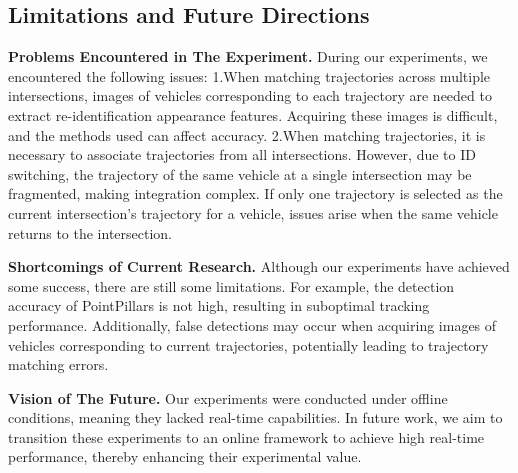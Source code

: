 \subsection{Limitations and Future Directions}

\textbf{Problems Encountered in The Experiment.}
During our experiments, we encountered the following issues:  
1.When matching trajectories across multiple intersections, images of vehicles corresponding to each trajectory are needed to extract re-identification appearance features. 
Acquiring these images is difficult, and the methods used can affect accuracy.  
2.When matching trajectories, it is necessary to associate trajectories from all intersections. 
However, due to ID switching, the trajectory of the same vehicle at a single intersection may be fragmented, making integration complex. 
If only one trajectory is selected as the current intersection's trajectory for a vehicle, issues arise when the same vehicle returns to the intersection.

\textbf{Shortcomings of Current Research.}
Although our experiments have achieved some success, there are still some limitations. 
For example, the detection accuracy of PointPillars is not high, resulting in suboptimal tracking performance. 
Additionally, false detections may occur when acquiring images of vehicles corresponding to current trajectories, potentially leading to trajectory matching errors.

\textbf{Vision of The Future.}
Our experiments were conducted under offline conditions, meaning they lacked real-time capabilities. 
In future work, we aim to transition these experiments to an online framework to achieve high real-time performance, thereby enhancing their experimental value.